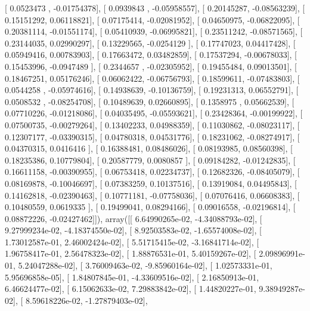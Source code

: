 \documentclass{article}
\begin{document}
       [ 0.0523473 , -0.01754378],
       [ 0.0939843 , -0.05958557],
       [ 0.20145287, -0.08563239],
       [ 0.15151292,  0.06118821],
       [ 0.07175414, -0.02081952],
       [ 0.04650975, -0.06822095],
       [ 0.20381114, -0.01551174],
       [ 0.05410939, -0.06995821],
       [ 0.23511242, -0.08571565],
       [ 0.23144035,  0.02990297],
       [ 0.13229565, -0.0254129 ],
       [ 0.17747023,  0.04417428],
       [ 0.05949416,  0.00783903],
       [ 0.17663472,  0.03482859],
       [ 0.17537294, -0.00678033],
       [ 0.15453996, -0.0947489 ],
       [ 0.2344657 , -0.02305952],
       [ 0.19455484,  0.09013501],
       [ 0.18467251,  0.05176246],
       [ 0.06062422, -0.06756793],
       [ 0.18599611, -0.07483803],
       [ 0.0544258 , -0.05974616],
       [ 0.14938639, -0.10136759],
       [ 0.19231313,  0.06552791],
       [ 0.0508532 , -0.08254708],
       [ 0.10489639,  0.02660895],
       [ 0.1358975 ,  0.05662539],
       [ 0.07710226, -0.01218086],
       [ 0.04035495, -0.05593621],
       [ 0.23428364, -0.00199922],
       [ 0.07500735, -0.00279264],
       [ 0.13402233,  0.04988359],
       [ 0.11030862, -0.08023117],
       [ 0.12307177, -0.03390315],
       [ 0.04780318,  0.04531776],
       [ 0.18231062, -0.08274917],
       [ 0.04370315,  0.0416416 ],
       [ 0.16388481,  0.08486026],
       [ 0.08193985,  0.08560398],
       [ 0.18235386,  0.10779804],
       [ 0.20587779,  0.0080857 ],
       [ 0.09184282, -0.01242835],
       [ 0.16611158, -0.00390955],
       [ 0.06753418,  0.02234737],
       [ 0.12682326, -0.08405079],
       [ 0.08169878, -0.10046697],
       [ 0.07383259,  0.10137516],
       [ 0.13919084,  0.04495843],
       [ 0.14162818, -0.02390463],
       [ 0.10771181, -0.07758036],
       [ 0.07076416,  0.06608383],
       [ 0.10480559,  0.0619335 ],
       [ 0.19499041,  0.08294166],
       [ 0.09016558, -0.02196814],
       [ 0.08872226, -0.02427462]]), array([[  6.64990265e-02,  -4.34088793e-02],
       [  9.27999234e-02,  -4.18374550e-02],
       [  8.92503583e-02,  -1.65574008e-02],
       [  1.73012587e-01,   2.46002424e-02],
       [  5.51715415e-02,  -3.16841714e-02],
       [  1.96758417e-01,   2.56478323e-02],
       [  1.88876531e-01,   5.40159267e-02],
       [  2.09896991e-01,   5.24047288e-02],
       [  3.76009463e-02,  -9.85960164e-02],
       [  1.02573331e-01,   5.95696858e-05],
       [  1.84807845e-01,  -4.33609516e-02],
       [  2.16850913e-01,   6.46624477e-02],
       [  6.15062633e-02,   7.29883842e-02],
       [  1.44820227e-01,   9.38949287e-02],
       [  8.59618226e-02,  -1.27879403e-02],
\end{document}

